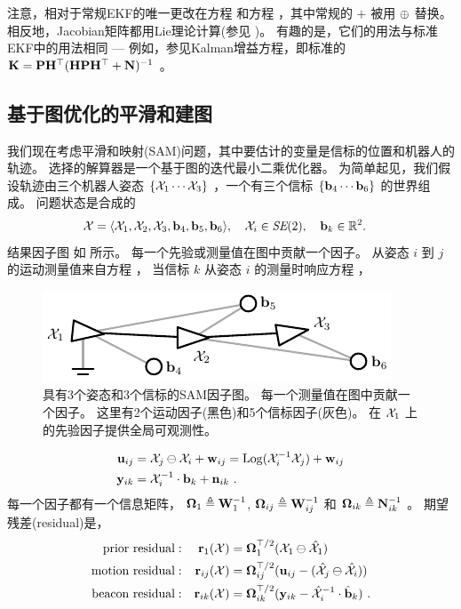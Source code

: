 注意，相对于常规EKF的唯一更改在方程  和方程 ，其中常规的 $+$ 被用 $\oplus$ 替换。
相反地，Jacobian矩阵都用Lie理论计算(参见 )。
有趣的是，它们的用法与标准EKF中的用法相同 --- 例如，参见Kalman增益方程，即标准的 ${\bf K} = {\bf P}{\bf H}^{\top}({\bf H}{\bf P}{\bf H}^{\top}+{\bf N})^{-1}$ 。


\subsection{基于图优化的平滑和建图}
\label{sec:SAM}

我们现在考虑平滑和映射(SAM)问题，其中要估计的变量是信标的位置和机器人的轨迹。
选择的解算器是一个基于图的迭代最小二乘优化器。
为简单起见，我们假设轨迹由三个机器人姿态 $\{\mathcal{X}_1\cdots\mathcal{X}_3\}$ ，一个有三个信标 $\{{\bf b}_4\cdots{\bf b}_6\}$ 的世界组成。
问题状态是合成的
%
\begin{align}\label{equ:SAM_state}
\mathcal{X} &= \langle
\mathcal{X}_1 , \mathcal{X}_2 , \mathcal{X}_3 , {\bf b}_4 , {\bf b}_5 , {\bf b}_6
\rangle, \quad \mathcal{X}_i\in\textit{SE}(2),\quad{\bf b}_k\in{\mathbb R}^2.
\end{align}
%
结果因子图 \cite{DELLAERT-IJRR-06} 如  所示。
每一个先验或测量值在图中贡献一个因子。
从姿态 $i$ 到 $j$ 的运动测量值来自方程  ，
当信标 $k$ 从姿态 $i$ 的测量时响应方程  ，
%
\begin{figure}
\centering
\includegraphics{figures/SAM}
\caption{具有3个姿态和3个信标的SAM因子图。
每一个测量值在图中贡献一个因子。
这里有2个运动因子(黑色)和5个信标因子(灰色)。
在 $\mathcal{X}_1$ 上的先验因子提供全局可观测性。}
\label{fig:graph-SLAM}
\end{figure}
%
%
\begin{align}
{\bf u}_{ij} &= \mathcal{X}_j\ominus\mathcal{X}_i + {\bf w}_{ij} = \operatorname*{Log}(\mathcal{X}_i^{-1}\mathcal{X}_j) + {\bf w}_{ij} \label{equ:meas_motion} \\
{\bf y}_{ik} &= \mathcal{X}_i^{-1}\cdot{\bf b}_k + {\bf n}_{ik}
~.
\end{align}
%
每一个因子都有一个信息矩阵， ${\bm \Omega}_{1} \triangleq {\bf W}_{1}^{-1}$, ${\bm \Omega}_{ij} \triangleq {\bf W}_{ij}^{-1}$ 和 ${\bm \Omega}_{ik} \triangleq {\bf N}_{ik}^{-1}$ 。
%
期望残差(residual)是，
%
\begin{align}
\textrm{prior residual}&:&{\bf r}_{1}(\mathcal{X}) &= {\bm \Omega}_{1}^{\top/2}(\mathcal{X}_1 \ominus \hat{\mathcal{X}}_1)
\notag
\\
\textrm{motion residual}&:&{\bf r}_{ij}(\mathcal{X}) &= {\bm \Omega}_{ij}^{\top/2}({\bf u}_{ij} - (\hat{\mathcal{X}}_j\ominus\hat{\mathcal{X}}_i))
\notag
\\
\textrm{beacon residual}&:&{\bf r}_{ik}(\mathcal{X}) &= {\bm \Omega}_{ik}^{\top/2}({\bf y}_{ik} - \hat{\mathcal{X}}_i^{-1}\cdot\hat{{\bf b}}_k)
\notag
~.
\end{align}

